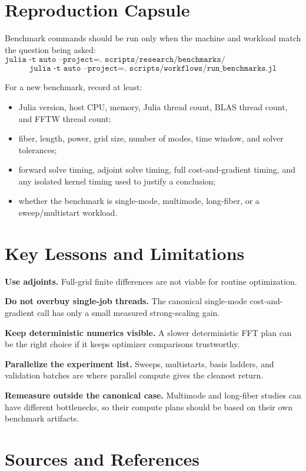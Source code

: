 \documentclass[11pt]{article}
\begin{document}
\section{Reproduction Capsule}

Benchmark commands should be run only when the machine and workload match the
question being asked:
\[
\texttt{julia -t auto --project=. scripts/research/benchmarks/benchmark\_threading.jl}
\]
\[
\texttt{julia -t auto --project=. scripts/workflows/run\_benchmarks.jl}
\]

For a new benchmark, record at least:
\begin{itemize}
    \item Julia version, host CPU, memory, Julia thread count, BLAS thread
    count, and FFTW thread count;
    \item fiber, length, power, grid size, number of modes, time window, and
    solver tolerances;
    \item forward solve timing, adjoint solve timing, full cost-and-gradient
    timing, and any isolated kernel timing used to justify a conclusion;
    \item whether the benchmark is single-mode, multimode, long-fiber, or a
    sweep/multistart workload.
\end{itemize}

\section{Key Lessons and Limitations}

\textbf{Use adjoints.} Full-grid finite differences are not viable for routine
optimization.

\textbf{Do not overbuy single-job threads.} The canonical single-mode
cost-and-gradient call has only a small measured strong-scaling gain.

\textbf{Keep deterministic numerics visible.} A slower deterministic FFT plan
can be the right choice if it keeps optimizer comparisons trustworthy.

\textbf{Parallelize the experiment list.} Sweeps, multistarts, basis ladders,
and validation batches are where parallel compute gives the cleanest return.

\textbf{Remeasure outside the canonical case.} Multimode and long-fiber studies
can have different bottlenecks, so their compute plans should be based on their
own benchmark artifacts.

\section{Sources and References}
\end{document}
